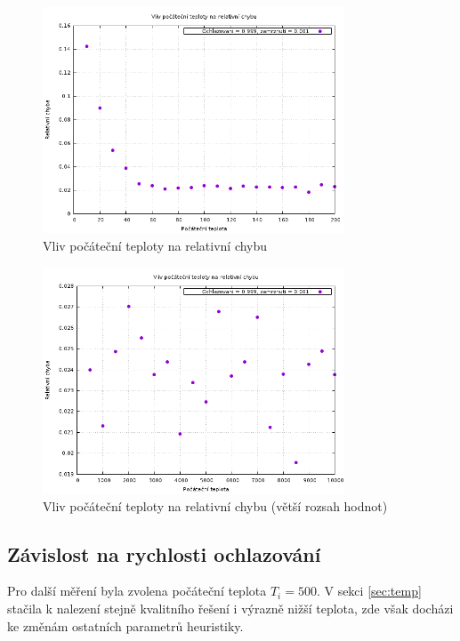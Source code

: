 \documentclass[11pt]{article}
\begin{document}
\begin{figure}[h!]
	\centering
    	\includegraphics[width=0.8\textwidth]{../grafy/temp_init_e2.png}
	\caption{Vliv počáteční teploty na relativní chybu}
	\label{fig:temp_init_e}
\end{figure}

\begin{figure}[h!]
	\centering
    	\includegraphics[width=0.8\textwidth]{../grafy/temp_init_e.png}
	\caption{Vliv počáteční teploty na relativní chybu (větší rozsah hodnot)}
	\label{fig:temp_init_e2}
\end{figure}

\subsection{Závislost na rychlosti ochlazování}

Pro další měření byla zvolena počáteční teplota $T_i = 500$. V sekci \ref{sec:temp} stačila k nalezení stejně kvalitního řešení i výrazně nižší teplota, zde však docházi ke změnám ostatních parametrů heuristiky.
\end{document}
